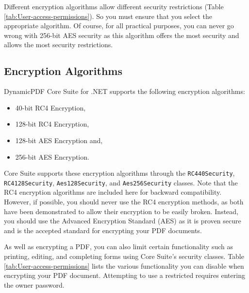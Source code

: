 \documentclass[american,letterpaper]{tufte-book}
\numberwithin{equation}{section}
\numberwithin{figure}{section}
\begin{document}
{Different encryption algorithms allow different security restrictions
(Table \ref{tab:User-access-permissions}). So you must ensure that you select the appropriate algorithm. Of course, for all practical purposes,
you can never go wrong with 256-bit AES security as this algorithm offers the most security and allows the most
security restrictions.

\subsection{Encryption Algorithms}

DynamicPDF Core Suite for .NET supports the following encryption
algorithms:
\begin{itemize}
\item 40-bit RC4 Encryption,
\item 128-bit RC4 Encryption,
\item 128-bit AES Encryption and,
\item 256-bit AES Encryption.
\end{itemize}
Core Suite supports these encryption algorithms through the \texttt{RC440Security},
\texttt{RC4128Security}, \texttt{Aes128Security}, and \texttt{Aes256Security}
classes. Note that the RC4 encryption algorithms are included here
for backward compatibility. However, if possible, you should never
use the RC4 encryption methods, as both have been demonstrated to
allow their encryption to be easily broken. Instead, you should use
the Advanced Encryption Standard (AES) as it is proven secure and
is the accepted standard for encrypting your PDF documents. 

As well as encrypting a PDF, you can also limit certain functionality
such as printing, editing, and completing forms using Core Suite's
security classes. Table \ref{tab:User-access-permissions} lists the
various functionality you can disable when encrypting your PDF document.
Attempting to use a restricted requires entering the owner password.

}
\end{document}
